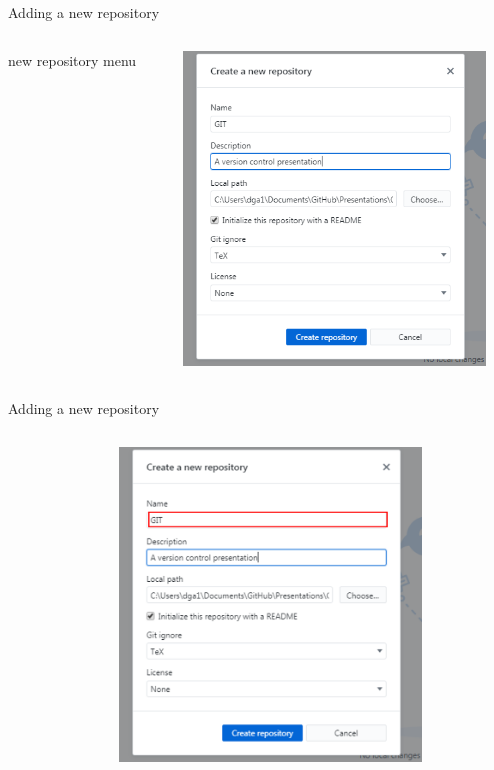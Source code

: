 \documentclass[10pt]{beamer}
\begin{document}
{\begin{frame}[fragile]{Adding a new repository}
\begin{columns}[T]
\begin{column}{.2\textwidth}
\small new repository menu
\end{column}
\begin{column}{.8\textwidth}
\includegraphics[width=8cm]{Figs/GHD/new_repo_00}
\end{column}
\end{columns}
\end{frame}


\begin{frame}[fragile]{Adding a new repository}
\begin{columns}[T]
\begin{column}{.2\textwidth}
\end{column}
\begin{column}{.8\textwidth}
\includegraphics[width=8cm]{Figs/GHD/new_repo_01}
\end{column}
\end{columns}
\end{frame}

}
\end{document}
